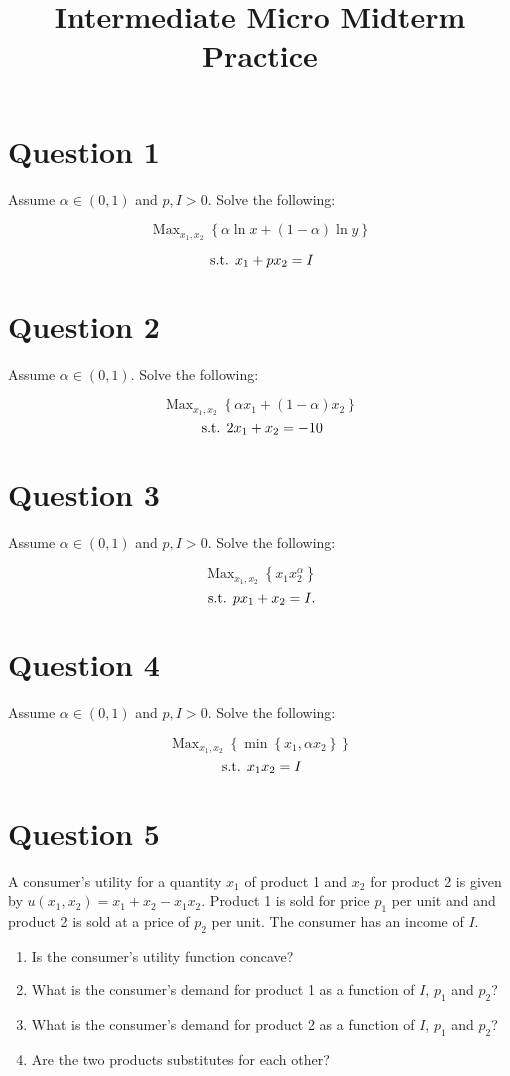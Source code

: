 \documentclass{article}
\DeclareMathOperator*{\Max}{Max}
\newcommand{\st}{\hbox{ s.t. }}
\begin{document}
\title{Intermediate Micro Midterm Practice}

\maketitle

\section*{Question 1}
Assume $\alpha \in (0,1)$ and $p, I >0$. Solve the following:

\[ \Max_{x_1, x_2} \left\{ \alpha \ln x + \left(1-\alpha \right) \ln y \right\}  \]

\[ \st x_1 + p x_2 = I \]

\section*{Question 2}
Assume $\alpha \in (0,1)$. Solve the following:

\[ \Max_{x_1, x_2} \left\{\alpha x_1 + (1-\alpha) x_2 \right\} \]
\[ \st  2x_1 + x_2 = -10 \]

\section*{Question 3}
Assume $\alpha \in (0,1)$ and $p, I >0$. Solve the following:

\[ \Max_{x_1, x_2} \left\{ x_1 x_2^\alpha \right\} \]
\[ \st p x_1 + x_2 =I. \]

\section*{Question 4}
Assume $\alpha \in (0,1)$ and $p, I >0$. Solve the following:

\[ \Max_{x_1, x_2} \left\{ \min \left\{x_1, \alpha x_2 \right\} \right\} \]
\[ \st  x_1x_2 = I \]

\section*{Question 5}
A consumer's utility for a quantity $x_1$ of product 1 and $x_2$ for product 2 is given by $u(x_1, x_2) = x_1 + x_2 - x_1x_2$. Product 1 is sold for price $p_1$ per unit and and product 2 is sold at a price of $p_2$ per unit. The consumer has an income of $I$.

\begin{enumerate}
\item Is the consumer's utility function concave?
\item What is the consumer's demand for product 1 as a function of $I$, $p_1$ and $p_2$?
\item What is the consumer's demand for product 2 as a function of $I$, $p_1$ and $p_2$?
\item Are the two products substitutes for each other?
\end{enumerate}
\end{document}
